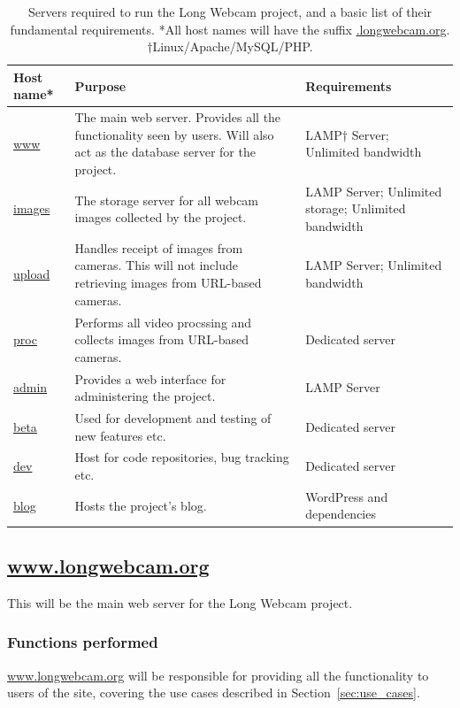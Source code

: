 \documentclass[11pt]{article}
\begin{document}
\begin{table}[h]
\begin{tabular}{ | p{0.45in} | p{4in} | p{1.45in} | }
\hline
\textbf{Host name*} & \textbf{Purpose} & \textbf{Requirements} \\
\hline
\url{www} & The main web server. Provides all the functionality seen by users. Will also act as the database server for the project. & LAMP$\dag$ Server; Unlimited bandwidth \\
\hline
\url{images} & The storage server for all webcam images collected by the project. & LAMP Server; Unlimited storage; Unlimited bandwidth \\
\hline
\url{upload} & Handles receipt of images from cameras. This will not include retrieving images from URL-based cameras. & LAMP Server; Unlimited bandwidth \\
\hline
\url{proc} & Performs all video procssing and collects images from URL-based cameras. & Dedicated server \\
\hline
\url{admin} & Provides a web interface for administering the project. & LAMP Server \\
\hline
\url{beta} & Used for development and testing of new features etc. & Dedicated server \\
\hline
\url{dev} & Host for code repositories, bug tracking etc. & Dedicated server \\
\hline
\url{blog} & Hosts the project's blog. & WordPress and dependencies \\
\hline
\end{tabular}
\caption{Servers required to run the Long Webcam project, and a basic list of their fundamental requirements. *All host names will have the suffix \protect\url{.longwebcam.org}. $\dag$Linux/Apache/MySQL/PHP.}
\label{tab:hosts}
\end{table}


\subsection{\protect\url{www.longwebcam.org}}
This will be the main web server for the Long Webcam project.

\subsubsection{Functions performed}
\url{www.longwebcam.org} will be responsible for providing all the functionality to users of the site, covering the use cases described in Section~\ref{sec:use_cases}.
\end{document}
